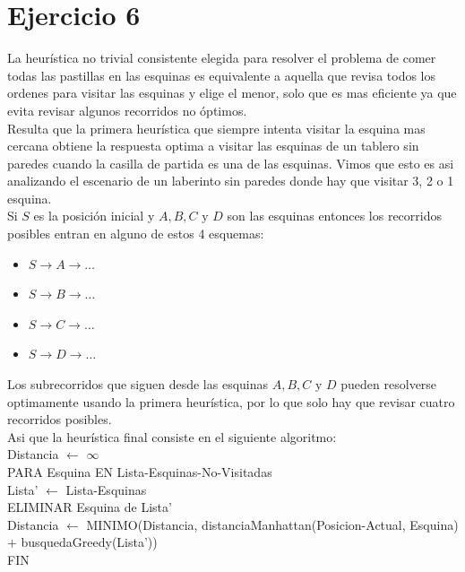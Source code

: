 \documentclass[12pt, titlepage, a4paper]{article}
\begin{document}
\section{Ejercicio 6}
La heurística no trivial consistente elegida para resolver el problema de comer todas las pastillas en las esquinas
es equivalente a aquella que revisa todos los ordenes para visitar las esquinas y elige el menor, solo que es mas eficiente
ya que evita revisar algunos recorridos no óptimos.\\

Resulta que la primera heurística que siempre intenta visitar la esquina mas cercana obtiene la respuesta optima
a visitar las esquinas de un tablero sin paredes cuando la casilla de partida es una de las esquinas. Vimos que esto es asi
analizando el escenario de un laberinto sin paredes donde hay que visitar 3, 2 o 1 esquina.\\

Si $S$ es la posición inicial y $A,B,C \text{ y } D$ son las esquinas entonces los recorridos posibles entran en alguno de estos 4 esquemas:

\begin{itemize}
    \item $S\rightarrow A \rightarrow \dots$
    \item $S\rightarrow B \rightarrow \dots$
    \item $S\rightarrow C \rightarrow \dots$
    \item $S\rightarrow D \rightarrow \dots$
\end{itemize}

Los subrecorridos que siguen desde las esquinas $A,B,C \text{ y } D$ pueden resolverse optimamente usando la primera heurística, por lo que
solo hay que revisar cuatro recorridos posibles.\\

Asi que la heurística final consiste en el siguiente algoritmo:\\

\noindent  Distancia $\leftarrow$ $\infty$\\

\noindent PARA Esquina EN Lista-Esquinas-No-Visitadas\\
\indent Lista' $\leftarrow$ Lista-Esquinas\\
\indent ELIMINAR Esquina de Lista'\\
\indent Distancia $\leftarrow$ MINIMO(Distancia, distanciaManhattan(Posicion-Actual, Esquina) + busquedaGreedy(Lista'))\\
\noindent FIN\\
\end{document}
